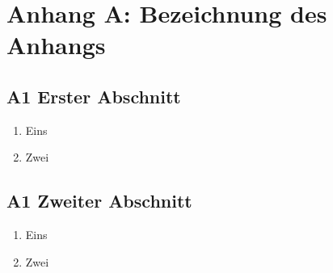 \section*{Anhang A: Bezeichnung des Anhangs}

\subsection*{A1 Erster Abschnitt}
\begin{enumerate}[noitemsep]
	\item Eins
	\item Zwei
\end{enumerate}

\subsection*{A1 Zweiter Abschnitt}
\begin{enumerate}[noitemsep]
	\item Eins
	\item Zwei
\end{enumerate}